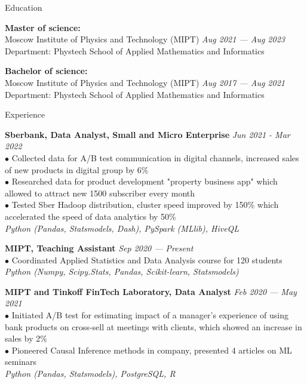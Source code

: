 \documentclass{resume} %
\begin{document}
\begin{rSection}{ Education }

{\bf Master of science:} \\
{Moscow Institute of Physics and Technology (MIPT)} \hfill {\em Aug 2021 — Aug 2023} \\ 
{Department:} {Phystech School of Applied Mathematics and Informatics}

{\bf Bachelor of science:} \\
{Moscow Institute of Physics and Technology (MIPT)} \hfill {\em Aug 2017 — Aug 2021} \\ 
{Department:} {Phystech School of Applied Mathematics and Informatics}

\end{rSection}

\begin{rSection}{ Experience }

    { \bf Sberbank, Data Analyst, Small and Micro Enterprise} \hfill {\em Jun 2021 - Mar 2022}\\
    { $\bullet$ Collected data for A/B test communication in digital channels, increased sales of new products in digital group by 6\% }\\
    { $\bullet$ Researched data for product development "property business app" which allowed to attract new 1500 subscriber every month }\\
    { $\bullet$ Tested Sber Hadoop distribution, cluster speed improved by 150\% which accelerated the speed of data analytics by 50\%}\\
    { \it Python (Pandas, Statsmodels, Dash), PySpark (MLlib), HiveQL}
    
    { \bf MIPT, Teaching Assistant} \hfill {\em Sep 2020 — Present}\\
    { $\bullet$ Coordinated Applied Statistics and Data Analysis course for 120 students }\\
    { \it Python (Numpy, Scipy.Stats, Pandas, Scikit-learn, Statsmodels) }
    
    { \bf MIPT and Tinkoff FinTech Laboratory, Data Analyst } \hfill {\em Feb 2020 — May 2021}\\
    { $\bullet$ Initiated A/B test for estimating impact of a manager's experience of using bank products on cross-sell at meetings with clients, which showed an increase in sales by 2\% }\\
    { $\bullet$ Pioneered Causal Inference methods in company, presented 4 articles on ML seminars  } \\
    { \it Python (Pandas, Statsmodels), PostgreSQL, R }
    

\end{rSection}
\end{document}
